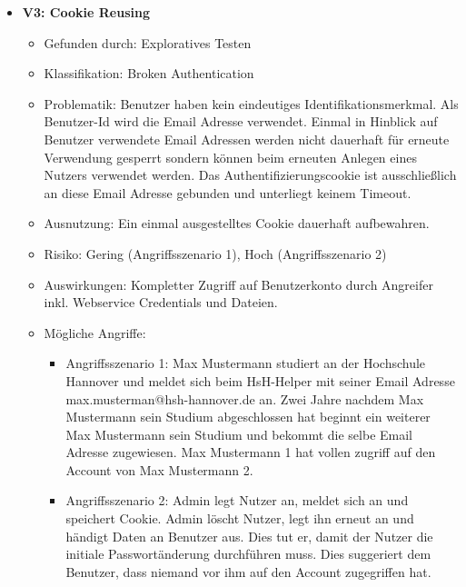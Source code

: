 \documentclass[12pt,DIV14,BCOR10mm,a4paper,parskip=half-,headsepline,headinclude,english,ngerman,bibliography=totocnumbered]{scrreprt}
\begin{document}
\begin{itemize}
  \hypertarget{vulnerability3}{}
  \item \textbf{V3: Cookie Reusing}
  \begin{itemize}
  \item Gefunden durch: Exploratives Testen
  \item Klassifikation: Broken Authentication
  \item Problematik: Benutzer haben kein eindeutiges Identifikationsmerkmal. Als Benutzer-Id wird die Email Adresse verwendet. Einmal in Hinblick auf Benutzer verwendete Email Adressen werden nicht dauerhaft für erneute Verwendung gesperrt sondern können beim erneuten Anlegen eines Nutzers verwendet werden. Das Authentifizierungscookie ist ausschließlich an diese Email Adresse gebunden und unterliegt keinem Timeout.
  \item Ausnutzung: Ein einmal ausgestelltes Cookie dauerhaft aufbewahren.
  \item Risiko: Gering (Angriffsszenario 1), Hoch (Angriffsszenario 2)
  \item Auswirkungen: Kompletter Zugriff auf Benutzerkonto durch Angreifer inkl. Webservice Credentials und Dateien.
  \item Mögliche Angriffe:
  	\begin{itemize}
  		\item Angriffsszenario 1: Max Mustermann studiert an der Hochschule Hannover und meldet sich beim HsH-Helper mit seiner Email Adresse max.musterman@hsh-hannover.de an. Zwei Jahre nachdem Max Mustermann sein Studium abgeschlossen hat beginnt ein weiterer Max Mustermann sein Studium und bekommt die selbe Email Adresse zugewiesen. Max Mustermann 1 hat vollen zugriff auf den Account von Max Mustermann 2.
  		\item Angriffsszenario 2: Admin legt Nutzer an, meldet sich an und speichert Cookie. Admin löscht Nutzer, legt ihn erneut an und händigt Daten an Benutzer aus. Dies tut er, damit der Nutzer die initiale Passwortänderung durchführen muss. Dies suggeriert dem Benutzer, dass niemand vor ihm auf den Account zugegriffen hat.
  	\end{itemize}

  \end{itemize}


\end{itemize}
\end{document}
